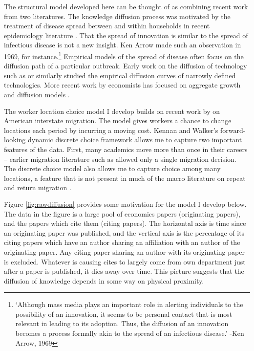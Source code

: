 \documentclass[]{article}
\begin{document}
The structural model developed here can be thought of as combining recent work from two literatures.
The knowledge diffusion process was motivated by the treatment of disease
spread between and within households in recent epidemiology literature \citep{cauchemez2004bayesian}.
That the spread of innovation is similar
to the spread of infectious disease is not a new insight. Ken Arrow made
such an observation in 1969, for instance.\footnote{`Although mass media
plays an important role in alerting individuals to the possibility of
an innovation, it seems to be personal contact that is most relevant
in leading to its adoption. Thus, the diffusion of an innovation
becomes a process formally akin to the spread of an infectious
disease.' -Ken Arrow, 1969}  Empirical models of the spread of disease
often focus on the diffusion path of a particular outbreak.
Early work on the diffusion of technology such as \citet{griliches1957hybrid} or \citet{rogers1962diffusion}
similarly studied the empirical diffusion curves of narrowly
defined technologies. More recent work by economists has focused on
aggregate growth and diffusion models \citep{caballero1993high, kortum1997research, eaton1999international,  lucas2008ideas, chor2013cumulative}.

The worker location choice model I develop builds on recent work by \citet{kennan2011effect} on American interstate migration.
The model gives workers a chance to change locations each period by incurring a moving cost.  Kennan and Walker's forward-looking dynamic discrete choice framework allows me to capture two important features of the data.  First, many academics move more than once in their 
careers -- earlier migration literature such as \citet{dahl2002mobility} allowed only a single migration decision.  The discrete choice model also allows me to capture choice among many locations, a feature that is not present in much of the macro literature on repeat and return migration \citep{dos2003migration, dustmann2003return}.

Figure \ref{fig:rawdiffusion} provides some
motivation for the model I develop below. The data in
the figure is a large pool of economics papers (originating papers), 
and the papers which cite them (citing papers).  The horizontal axis
is time since an originating paper was published, and the vertical
axis is the percentage of its citing papers which have an author
sharing an affiliation with an author of the originating paper.
Any citing paper sharing an author with its originating paper is
excluded. Whatever is causing cites to largely come from own department
just after a paper is published, it dies away over time. This picture
suggests that the diffusion of knowledge depends in some way on physical
proximity.
\end{document}
